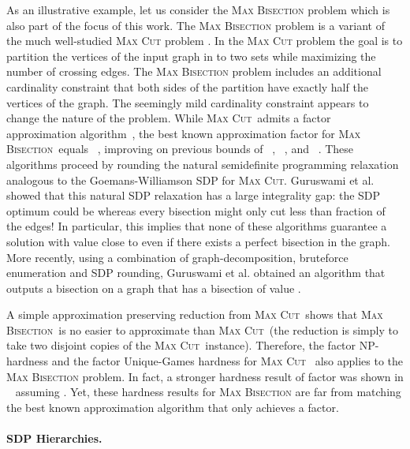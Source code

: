 \documentclass[11pt]{article}
\theoremstyle{definition}
\newcommand{\etal}{et al.\xspace}
\newcommand{\problemmacro}[1]{\texorpdfstring{\textsc{#1}}{#1}\xspace}
\newcommand{\maxcut}{\problemmacro{Max Cut}}
\newcommand{\maxbisection}{\problemmacro{Max Bisection}}
\numberwithin{equation}{section}
\let\origparagraph\paragraph
\renewcommand{\paragraph}[1]{\origparagraph{#1.}}
\begin{document}
As an illustrative example, let us consider the \maxbisection problem
which is also part of the focus of this work.  The \maxbisection problem is
a variant of the much well-studied \maxcut problem
\cite{GoemansW95,KhotKMO07}.  In the \maxcut
problem the goal is to partition the vertices of the input graph in to
two sets while maximizing the number of crossing edges.  The
\maxbisection problem includes an additional cardinality constraint
that both sides of the partition have exactly half the vertices of the
graph.
The seemingly mild cardinality constraint appears to change the nature
of the problem.  While \maxcut\ admits a factor  approximation
algorithm~\cite{GoemansW95}, the best known
approximation factor for \maxbisection\ equals
~\cite{FeigeL06}, improving on previous bounds of
~\cite{FriezeJ97}, ~\cite{Ye01}, and
~\cite{HalperinZ02}. These algorithms proceed by rounding
the natural semidefinite programming relaxation analogous to the
Goemans-Williamson SDP for \maxcut.  Guruswami \etal
\cite{GuruswamiMRSZ11} showed that this natural SDP relaxation has a large integrality gap: the SDP
optimum could be  whereas every bisection might only cut less than
 fraction of the edges!  In particular, this implies that none
of these algorithms guarantee a solution with value close to  even
if there exists a perfect bisection in the graph.  More recently,
using a combination of graph-decomposition, bruteforce enumeration and
SDP rounding, Guruswami \etal \cite{GuruswamiMRSZ11} obtained an algorithm that
outputs a  bisection on a graph that has a
bisection of value .

A simple approximation preserving
reduction from \maxcut\ shows that \maxbisection\ is no easier to
approximate than \maxcut\ (the reduction is simply to take two
disjoint copies of the \maxcut\ instance). Therefore, the factor
 NP-hardness \cite{Hastad01,TrevisanSSW00} and the factor  Unique-Games
hardness for \maxcut~\cite{KhotKMO07} also applies to the
\maxbisection problem.  In fact, a stronger hardness result of factor 
was shown in ~\cite{HolmerinK04} assuming .
Yet, these hardness results for \maxbisection are far from matching the
best known approximation algorithm that only achieves a  factor.

\paragraph{SDP Hierarchies}
\end{document}
